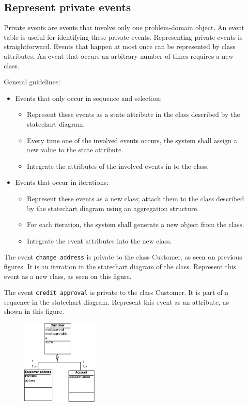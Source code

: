 \subsection{Represent private events}
Private events are events that involve only one problem-domain object. An event table is useful for identifying these private events. Representing private events is straightforward. Events that happen at most once can be represented by class attributes. An event that occurs an arbitrary number of times requires a new class.

\noindent General guidelines:
\begin{itemize}
    \item Events that only occur in sequence and selection:
    \begin{itemize}
        \item Represent these events as a state attribute in the class described by the statechart diagram. 
        \item Every time one of the involved events occurs, the system shall assign a new value to the state attribute.
        \item Integrate the attributes of the involved events in to the class.
    \end{itemize}
    \item Events that occur in iterations:
    \begin{itemize}
        \item Represent these events as a new class; attach them to the class described by the statechart diagram using an aggregation structure. 
        \item For each iteration, the system shall generate a new object from the class.
        \item Integrate the event attributes into the new class.
    \end{itemize}
\end{itemize}

The event \texttt{change address} is private to the class Customer, as seen on previous figures. It is an iteration in the statechart diagram of the class. Represent this event as a new class, as seen on this figure.

The event \texttt{credit approval} is private to the class Customer. It is part of a sequence in the statechart diagram. Represent this event as an attribute, as shown in this figure.

\begin{figure}[H]
    \centering
    \includegraphics[width=0.35\textwidth]{figures/modelcomponentprivateevents.png}
\end{figure}

